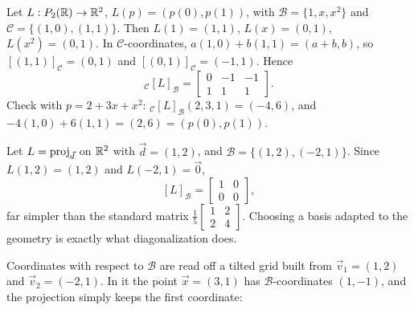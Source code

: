 \begin{example}
Let $L:P_{2}(\mathbb{R})\to\mathbb{R}^2$, $L(p)=(p(0),p(1))$, with $\mathcal B=\{1,x,x^2\}$ and $\mathcal C=\{(1,0),(1,1)\}$. Then
$L(1)=(1,1)$, $L(x)=(0,1)$, $L(x^2)=(0,1)$. In $\mathcal C$-coordinates, $a(1,0)+b(1,1)=(a+b,b)$, so
$[(1,1)]_{\mathcal C}=(0,1)$ and $[(0,1)]_{\mathcal C}=(-1,1)$. Hence
\[
  {}_{\mathcal C}[L]_{\mathcal B}=\begin{bmatrix}0&-1&-1\\1&1&1\end{bmatrix}.
\]
Check with $p=2+3x+x^2$: ${}_{\mathcal C}[L]_{\mathcal B}(2,3,1)=(-4,6)$, and $-4(1,0)+6(1,1)=(2,6)=(p(0),p(1))$.
\end{example}

\begin{example}
Let $L=\operatorname{proj}_{\vec d}$ on $\mathbb{R}^2$ with $\vec d=(1,2)$, and $\mathcal B=\{(1,2),(-2,1)\}$. Since $L(1,2)=(1,2)$ and
$L(-2,1)=\vec 0$,
\[
  [L]_{\mathcal B}=\begin{bmatrix}1&0\\0&0\end{bmatrix},
\]
far simpler than the standard matrix $\frac15\begin{bmatrix}1&2\\2&4\end{bmatrix}$. Choosing a basis adapted to the
geometry is exactly what diagonalization does.
\end{example}

Coordinates with respect to $\mathcal B$ are read off a tilted grid built from $\vec v_1 = (1,2)$ and
$\vec v_2 = (-2,1)$. In it the point $\vec x = (3,1)$ has $\mathcal B$-coordinates $(1,-1)$, and the
projection simply keeps the first coordinate:
\begin{center}
\end{center}

